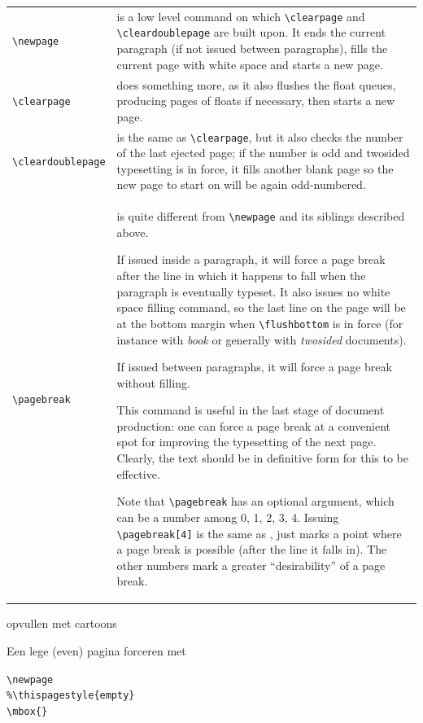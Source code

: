 \documentclass[../../main.tex]{subfiles}
\begin{document}
\begin{flushleft}
\hspace*{-\marginparsep-\marginparwidth}%
\begin{tabular}{|p{\marginparwidth}|p{11cm}|}
\verb+\newpage+& is a low level command on which \verb+\clearpage+ and \verb+\cleardoublepage+ are built upon. It ends the current paragraph (if not issued between paragraphs), fills the current page with white space and starts a new page.\\
\verb+\clearpage+&does something more, as it also flushes the float queues, producing pages of floats if necessary, then starts a new page. \\
\verb+\cleardoublepage+&is the same as \verb+\clearpage+, but it also checks the number of the last ejected page; if the number is odd and twosided typesetting is in force, it fills another blank page so the new page to start on will be again odd-numbered.\\
\verb+\pagebreak+&  is quite different from \verb+\newpage+ and its siblings described above.

If issued inside a paragraph, it will force a page break after the line in which it happens to fall when the paragraph is eventually typeset. It also issues no white space filling command, so the last line on the page will be at the bottom margin when \verb+\flushbottom+ is in force (for instance with \textit{book} or generally with \textit{twosided} documents).

If issued between paragraphs, it will force a page break without filling.

This command is useful in the last stage of document production: one can force a page break at a convenient spot for improving the typesetting of the next page. Clearly, the text should be in definitive form for this to be effective.

Note that \verb+\pagebreak+ has an optional argument, which can be a number among 0, 1, 2, 3, 4. Issuing \verb+\pagebreak[4]+ is the same as \pagebreak, \pagebreak[0] just marks a point where a page break is possible (after the line it falls in). The other numbers mark a greater “desirability” of a page break.
\end{tabular}
\end{flushleft}

opvullen met cartoons

Een lege (even) pagina forceren met 

\verb+\newpage+\\
\verb+%\thispagestyle{empty}+\\
\verb+\mbox{}+
\end{document}
